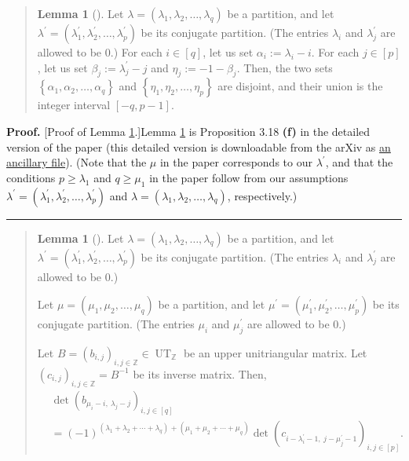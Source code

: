 \documentclass[numbers=enddot,12pt,final,onecolumn,notitlepage]{scrartcl}%
\newenvironment{statement}{\begin{quote}}{\end{quote}}
\theoremstyle{definition}
\newtheorem{lem}[theo]{Lemma}
\newenvironment{lemmain}[1][]
{\begin{statement}\begin{lem}[#1]}
{\end{lem}\end{statement}}
\newenvironment{proof}[1][Proof]{\noindent\textbf{#1.} }{\ \rule{0.5em}{0.5em}}
\newenvironment{lemmain}[1][Proof]{\noindent\textbf{#1.} }{\ \rule{0.5em}{0.5em}}
\begin{document}
\begin{enumerate}
\begin{lemmain}
\label{lem.A4}Let $\lambda=\left(  \lambda_{1},\lambda_{2},\ldots,\lambda
_{q}\right)  $ be a partition, and let $\lambda^{\prime}=\left(  \lambda
_{1}^{\prime},\lambda_{2}^{\prime},\ldots,\lambda_{p}^{\prime}\right)  $ be
its conjugate partition. (The entries $\lambda_{i}$ and $\lambda_{j}^{\prime}$
are allowed to be $0$.) For each $i\in\left[  q\right]  $, let us set
$\alpha_{i}:=\lambda_{i}-i$. For each $j\in\left[  p\right]  $, let us set
$\beta_{j}:=\lambda_{j}^{\prime}-j$ and $\eta_{j}:=-1-\beta_{j}$. Then, the
two sets $\left\{  \alpha_{1},\alpha_{2},\ldots,\alpha_{q}\right\}  $ and
$\left\{  \eta_{1},\eta_{2},\ldots,\eta_{p}\right\}  $ are disjoint, and their
union is the integer interval $\left[  -q,p-1\right]  $.
\end{lemmain}

\begin{proof}
[Proof of Lemma \ref{lem.A4}.]Lemma \ref{lem.A4} is Proposition 3.18
\textbf{(f)} in the detailed version of the paper \cite{petriesym} (this
detailed version is downloadable from the arXiv as
\href{https://arxiv.org/src/2004.11194v3/anc/petriesym-long.pdf}{an ancillary
file}). (Note that the $\mu$ in the paper corresponds to our $\lambda^{\prime
}$, and that the conditions $p\geq\lambda_{1}$ and $q\geq\mu_{1}$ in the paper
follow from our assumptions $\lambda^{\prime}=\left(  \lambda_{1}^{\prime
},\lambda_{2}^{\prime},\ldots,\lambda_{p}^{\prime}\right)  $ and
$\lambda=\left(  \lambda_{1},\lambda_{2},\ldots,\lambda_{q}\right)  $, respectively.)
\end{proof}

\begin{lemmain}
\label{lem.A5}Let $\lambda=\left(  \lambda_{1},\lambda_{2},\ldots,\lambda
_{q}\right)  $ be a partition, and let $\lambda^{\prime}=\left(  \lambda
_{1}^{\prime},\lambda_{2}^{\prime},\ldots,\lambda_{p}^{\prime}\right)  $ be
its conjugate partition. (The entries $\lambda_{i}$ and $\lambda_{j}^{\prime}$
are allowed to be $0$.)

Let $\mu=\left(  \mu_{1},\mu_{2},\ldots,\mu_{q}\right)  $ be a partition, and
let $\mu^{\prime}=\left(  \mu_{1}^{\prime},\mu_{2}^{\prime},\ldots,\mu
_{p}^{\prime}\right)  $ be its conjugate partition. (The entries $\mu_{i}$ and
$\mu_{j}^{\prime}$ are allowed to be $0$.)

Let $B=\left(  b_{i,j}\right)  _{i,j\in\mathbb{Z}}\in\operatorname*{UT}%
\nolimits_{\mathbb{Z}}$ be an upper unitriangular matrix. Let $\left(
c_{i,j}\right)  _{i,j\in\mathbb{Z}}=B^{-1}$ be its inverse matrix. Then,%
\begin{align*}
&  \det\left(  b_{\mu_{i}-i,\ \lambda_{j}-j}\right)  _{i,j\in\left[  q\right]
}\\
&  =\left(  -1\right)  ^{\left(  \lambda_{1}+\lambda_{2}+\cdots+\lambda
_{q}\right)  +\left(  \mu_{1}+\mu_{2}+\cdots+\mu_{q}\right)  }\det\left(
c_{i-\lambda_{i}^{\prime}-1,\ j-\mu_{j}^{\prime}-1}\right)  _{i,j\in\left[
p\right]  }.
\end{align*}


\end{lemmain}
\end{enumerate}
\end{document}
